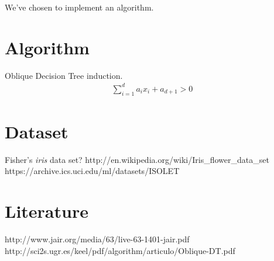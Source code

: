 \documentclass{article}
\begin{document}
    We've chosen to implement an algorithm.

    \section*{Algorithm}
    Oblique Decision Tree induction.
    \begin{align*}
        \sum_{i=1}^{d}a_i x_i + a_{d+1} > 0 
    \end{align*}

    \section*{Dataset}
    Fisher's \emph{iris} data set?
    http://en.wikipedia.org/wiki/Iris_flower_data_set
    https://archive.ics.uci.edu/ml/datasets/ISOLET

    \section*{Literature}
    http://www.jair.org/media/63/live-63-1401-jair.pdf
    http://sci2s.ugr.es/keel/pdf/algorithm/articulo/Oblique-DT.pdf
\end{document}
